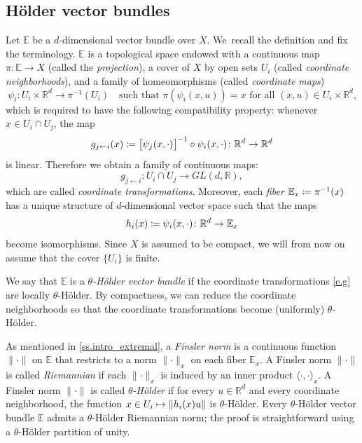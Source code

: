 \documentclass[JEP,XML,SOM,Unicode]{cedram}
\def\vcentcolon{\mathrel{\mathop\ordinarycolon}}
\providecommand\ordinarycolon{:}
\providecommand*\coloneqq{\vcentcolon\mathrel{\mkern-1.2mu}=}
\newcommand\mto{\mathchoice{\longmapsto}{\mapsto}{\mapsto}{\mapsto}}
\theoremstyle{plain}
\theoremstyle{definition}
\newcommand{\RR}{\mathbb{R}}
\newcommand{\EE}{\mathbb{E}}
\newcommand{\GL}{\mathit{GL}}
\begin{document}
\subsection{Hölder vector bundles}

Let $\EE$ be a $d$-dimensional vector bundle over $X$.
We~recall the definition and fix the terminology. $\EE$ is a topological space endowed with a continuous map ${\pi \colon \EE \to X}$ (called the \emph{projection}),
a cover of $X$ by open sets $U_i$ (called \emph{coordinate neighborhoods}),
and a family of homeomorphisms (called \emph{coordinate maps})
\[
\psi_i \colon U_i \times \RR^d \to \pi^{-1}(U_i) \quad
\text{such that $\pi( \psi_i(x, u) ) = x$ for all $(x,u) \in U_i \times \RR^d$,}
\]
which is required to have the following compatibility property:
whenever $x \in U_i \cap U_j$, the map
\[
g_{j \gets i}(x) \coloneqq \big[ \psi_j(x, \mathord{\cdot})\big]^{-1} \circ \psi_i(x, \mathord{\cdot}) \colon \RR^d \to \RR^d
\]
is linear.
Therefore we obtain a family of continuous maps:
\begin{equation}\label{e.g}
g_{j \gets i} \colon U_i \cap U_j \to \GL(d,\RR),
\end{equation}
which are called \emph{coordinate transformations}.
Moreover, each \emph{fiber} $\EE_x \coloneqq \pi^{-1}(x)$ has a unique structure of $d$-dimensional vector space
such that the maps
\begin{equation}\label{e.h_i}
h_i(x) \coloneqq \psi_i(x, \mathord{\cdot}) \colon \RR^d \to \EE_x
\end{equation}
become isomorphisms.
Since $X$ is assumed to be compact, we will from now on assume that the cover $\{U_i\}$ is finite.

We say that $\EE$ is a \emph{$\theta$-Hölder vector bundle} if the coordinate transformations \eqref{e.g} are locally $\theta$-Hölder. By compactness, we can reduce the coordinate neighborhoods so that the coordinate transformations become (uniformly) $\theta$-Hölder.

As mentioned in \cref{ss.intro_extremal}, a \emph{Finsler norm}
is a continuous function $\| \mathord{\cdot} \|$ on $\EE$ that restricts to a norm $\| \mathord{\cdot} \|_x$ on each fiber $\EE_x$.
A Finsler norm $\| \mathord{\cdot} \|$ is called \emph{Riemannian} if each $\| \mathord{\cdot} \|_x$ is induced by an inner product $\langle \mathord{\cdot}, \mathord{\cdot} \rangle_x$.
A Finsler norm $\| \mathord{\cdot} \|$ is called \emph{$\theta$-Hölder} if for every $u \in \RR^d$ and every coordinate neighborhood, the function $x \in U_i \mto \| h_i(x) u \| $ is $\theta$-Hölder.
Every $\theta$-Hölder vector bundle $\EE$ admits a $\theta$-Hölder Riemannian norm; the proof is straightforward using a $\theta$-Hölder partition of unity.
\end{document}
